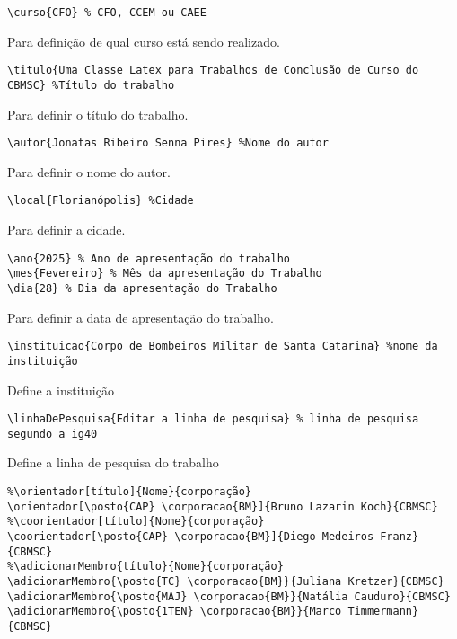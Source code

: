 \begin{itemize}
    \begin{verbatim}
\curso{CFO} % CFO, CCEM ou CAEE
\end{verbatim}

Para definição de qual curso está sendo realizado.

\begin{verbatim}
\titulo{Uma Classe Latex para Trabalhos de Conclusão de Curso do CBMSC} %Título do trabalho
\end{verbatim}

Para definir o título do trabalho.

\begin{verbatim}
\autor{Jonatas Ribeiro Senna Pires} %Nome do autor
\end{verbatim}

Para definir o nome do autor.

\begin{verbatim}
\local{Florianópolis} %Cidade
\end{verbatim}

Para definir a cidade.

\begin{verbatim}
\ano{2025} % Ano de apresentação do trabalho
\mes{Fevereiro} % Mês da apresentação do Trabalho
\dia{28} % Dia da apresentação do Trabalho
\end{verbatim}

Para definir a data de apresentação do trabalho.

\begin{verbatim}
\instituicao{Corpo de Bombeiros Militar de Santa Catarina} %nome da instituição
\end{verbatim}

Define a instituição

\begin{verbatim}
\linhaDePesquisa{Editar a linha de pesquisa} % linha de pesquisa segundo a ig40
\end{verbatim}

Define a linha de pesquisa do trabalho
\begin{verbatim}
%\orientador[título]{Nome}{corporação}
\orientador[\posto{CAP} \corporacao{BM}]{Bruno Lazarin Koch}{CBMSC} 
%\coorientador[título]{Nome}{corporação}
\coorientador[\posto{CAP} \corporacao{BM}]{Diego Medeiros Franz}{CBMSC}
%\adicionarMembro{título}{Nome}{corporação}  
\adicionarMembro{\posto{TC} \corporacao{BM}}{Juliana Kretzer}{CBMSC} 
\adicionarMembro{\posto{MAJ} \corporacao{BM}}{Natália Cauduro}{CBMSC}
\adicionarMembro{\posto{1TEN} \corporacao{BM}}{Marco Timmermann}{CBMSC}
\end{verbatim}


\end{itemize}
